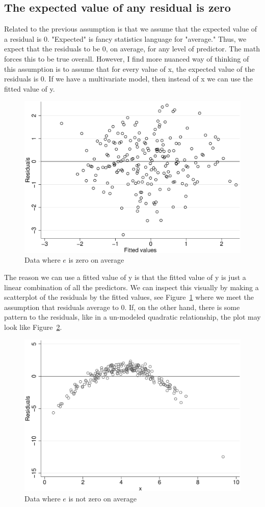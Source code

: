 \subsection{The expected value of any residual is zero}
Related to the previous assumption is that we assume that the expected value of a residual is 0. "Expected" is fancy statistics language for "average." Thus, we expect that the residuals to be 0, on average, for any level of predictor. The math forces this to be true overall. However, I find more nuanced way of thinking of this assumption is to assume that for every value of x, the expected value of the residuals is 0. If we have a multivariate model, then instead of x we can use the fitted value of y.
\begin{figure}
   \centering
   \includegraphics[angle=0,
           width=.75\textwidth]{mean0ok.eps}
   \caption{Data where $e$ is zero on average}
  \label{fig:mean0ok}
\end{figure}
The reason we can use a fitted value of y is that the fitted value of y is just a linear combination of all the predictors. We can inspect this visually by making a scatterplot of the residuals by the fitted values, see Figure~\ref{fig:mean0ok} where we meet the assumption that residuals average to 0. If, on the other hand, there is some pattern to the residuals, like in a un-modeled quadratic relationship, the plot may look like Figure~\ref{fig:mean0notok}.
\begin{figure}
   \centering
   \includegraphics[angle=0,
           width=.75\textwidth]{mean0notok.eps}
   \caption{Data where $e$ is not zero on average}
  \label{fig:mean0notok}
\end{figure}
